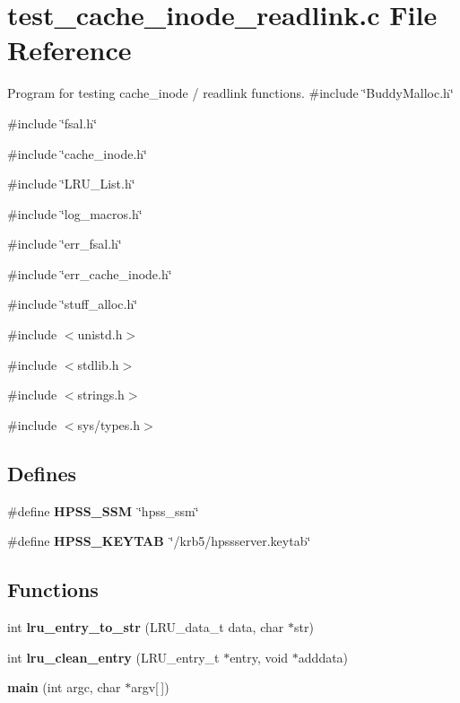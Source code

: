 \section{test\_\-cache\_\-inode\_\-readlink.c File Reference}
\label{test__cache__inode__readlink_8c}


Program for testing cache\_\-inode / readlink functions.  
{\ttfamily \#include \char`\"{}BuddyMalloc.h\char`\"{}}\par
{\ttfamily \#include \char`\"{}fsal.h\char`\"{}}\par
{\ttfamily \#include \char`\"{}cache\_\-inode.h\char`\"{}}\par
{\ttfamily \#include \char`\"{}LRU\_\-List.h\char`\"{}}\par
{\ttfamily \#include \char`\"{}log\_\-macros.h\char`\"{}}\par
{\ttfamily \#include \char`\"{}err\_\-fsal.h\char`\"{}}\par
{\ttfamily \#include \char`\"{}err\_\-cache\_\-inode.h\char`\"{}}\par
{\ttfamily \#include \char`\"{}stuff\_\-alloc.h\char`\"{}}\par
{\ttfamily \#include $<$unistd.h$>$}\par
{\ttfamily \#include $<$stdlib.h$>$}\par
{\ttfamily \#include $<$strings.h$>$}\par
{\ttfamily \#include $<$sys/types.h$>$}\par
\subsection*{Defines}
\begin{DoxyCompactItemize}
\item 
\#define {\bf HPSS\_\-SSM}~\char`\"{}hpss\_\-ssm\char`\"{}
\item 
\#define {\bf HPSS\_\-KEYTAB}~\char`\"{}/krb5/hpssserver.keytab\char`\"{}
\end{DoxyCompactItemize}
\subsection*{Functions}
\begin{DoxyCompactItemize}
\item 
int {\bf lru\_\-entry\_\-to\_\-str} (LRU\_\-data\_\-t data, char $\ast$str)
\item 
int {\bf lru\_\-clean\_\-entry} (LRU\_\-entry\_\-t $\ast$entry, void $\ast$adddata)
\item 
{\bf main} (int argc, char $\ast$argv[$\,$])
\end{DoxyCompactItemize}


